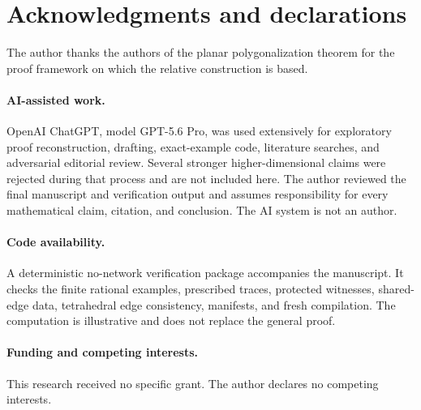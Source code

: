 \section*{Acknowledgments and declarations}

The author thanks the authors of the planar polygonalization theorem for the
proof framework on which the relative construction is based.

\paragraph{AI-assisted work.}
OpenAI ChatGPT, model GPT-5.6 Pro, was used extensively for exploratory proof
reconstruction, drafting, exact-example code, literature searches, and
adversarial editorial review.  Several stronger higher-dimensional claims
were rejected during that process and are not included here.  The author
reviewed the final manuscript and verification output and assumes
responsibility for every mathematical claim, citation, and conclusion.  The
AI system is not an author.

\paragraph{Code availability.}
A deterministic no-network verification package accompanies the manuscript.
It checks the finite rational examples, prescribed traces, protected
witnesses, shared-edge data, tetrahedral edge consistency, manifests, and
fresh compilation.  The computation is illustrative and does not replace the
general proof.

\paragraph{Funding and competing interests.}
This research received no specific grant.  The author declares no competing
interests.

